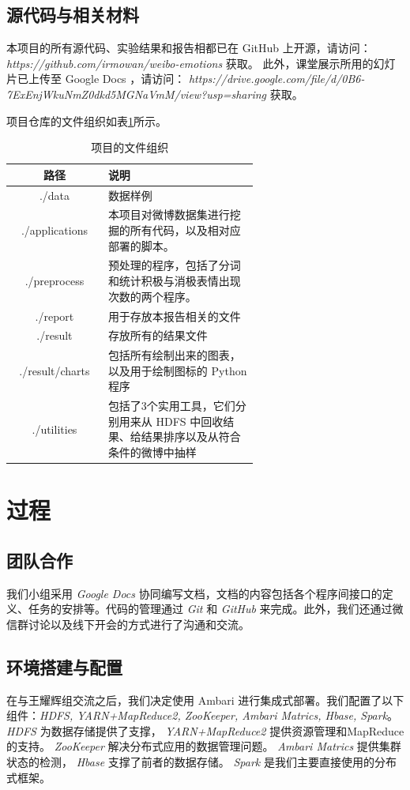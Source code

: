 \documentclass[12pt, oneside]{article}
\begin{document}
\begin{spacing}{1.5}
\begin{CJK}{UTF8}{gbsn}
\subsection{源代码与相关材料}
本项目的所有源代码、实验结果和报告相都已在 GitHub 上开源，请访问： {\it https://github.com/irmowan/weibo-emotions} 获取。
此外，课堂展示所用的幻灯片已上传至 Google Docs ，请访问： {\it https://drive.google.com/file/d/0B6-7ExEnjWkuNmZ0dkd5MGNaVmM/view?usp=sharing} 获取。

项目仓库的文件组织如表\ref{tbl:files_organization}所示。
\begin{table}[]
\centering
\begin{tabular}{|c|p{0.618\linewidth}|}
\hline
路径              & 说明                               \\ \hline
./data	   &  数据样例			\\ \hline
./applications  & 本项目对微博数据集进行挖掘的所有代码，以及相对应部署的脚本。    \\ \hline
./preprocess    & 预处理的程序，包括了分词和统计积极与消极表情出现次数的两个程序。 \\ \hline
./report        & 用于存放本报告相关的文件                     \\ \hline
./result        & 存放所有的结果文件                        \\ \hline
./result/charts & 包括所有绘制出来的图表，以及用于绘制图标的 Python 程序    \\ \hline
./utilities     & 包括了3个实用工具，它们分别用来从 HDFS 中回收结果、给结果排序以及从符合条件的微博中抽样        \\ \hline
\end{tabular}
\caption{项目的文件组织}
\label{tbl:files_organization}
\end{table}

\section{过程}
\subsection{团队合作}
我们小组采用 {\it Google Docs} 协同编写文档，文档的内容包括各个程序间接口的定义、任务的安排等。代码的管理通过 {\it Git} 和 {\it GitHub} 来完成。此外，我们还通过微信群讨论以及线下开会的方式进行了沟通和交流。

\subsection{环境搭建与配置}
在与王耀辉组交流之后，我们决定使用 Ambari 进行集成式部署。我们配置了以下组件：{\it HDFS, YARN+MapReduce2, ZooKeeper, Ambari  Matrics, Hbase, Spark}。 {\it HDFS} 为数据存储提供了支撑， {\it YARN+MapReduce2} 提供资源管理和MapReduce的支持。 {\it ZooKeeper} 解决分布式应用的数据管理问题。 {\it Ambari Matrics} 提供集群状态的检测， {\it Hbase} 支撑了前者的数据存储。 {\it Spark} 是我们主要直接使用的分布式框架。


\end{CJK}
\end{spacing}
\end{document}
